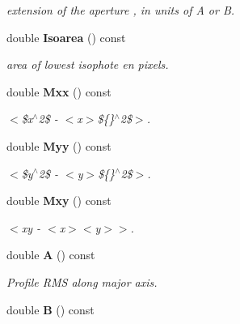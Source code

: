\begin{CompactItemize}
\begin{CompactList}\small\item\em extension of the aperture , in units of A or B.\item\end{CompactList}\item 
{}
double {\bf Isoarea} () const\label{class_sestar_a27}

\begin{CompactList}\small\item\em area of lowest isophote en pixels.\item\end{CompactList}\item 
{}
double {\bf Mxx} () const\label{class_sestar_a28}

\begin{CompactList}\small\item\em $<$\$x$^\wedge$2\$ - $<$x$>$\$\{\}$^\wedge$2\$$>$.\item\end{CompactList}\item 
{}
double {\bf Myy} () const\label{class_sestar_a29}

\begin{CompactList}\small\item\em $<$\$y$^\wedge$2\$ - $<$y$>$\$\{\}$^\wedge$2\$$>$.\item\end{CompactList}\item 
{}
double {\bf Mxy} () const\label{class_sestar_a30}

\begin{CompactList}\small\item\em $<$xy - $<$x$>$$<$y$>$$>$.\item\end{CompactList}\item 
{}
double {\bf A} () const\label{class_sestar_a31}

\begin{CompactList}\small\item\em Profile RMS along major axis.\item\end{CompactList}\item 
{}
double {\bf B} () const\label{class_sestar_a32}


\end{CompactItemize}

